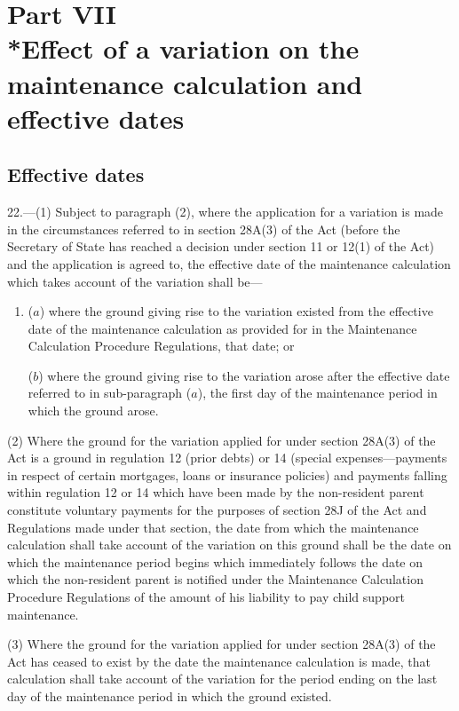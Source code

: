\documentclass[12pt,a4paper]{article}
\begin{document}
\section[Part VII --- Effect of a variation on the maintenance calculation and effective dates]{Part VII\\*Effect of a variation on the maintenance calculation and effective dates}

\renewcommand\parthead{--- Part VII}

\subsection[22. Effective dates]{Effective dates}

22.---(1)  Subject to paragraph (2), where the application for a variation is made in the circumstances referred to in section 28A(3) of the Act (before the Secretary of State has reached a decision under section 11 or 12(1) of the Act) and the application is agreed to, the effective date of the maintenance calculation which takes account of the variation shall be—
\begin{enumerate}\item[]
($a$) where the ground giving rise to the variation existed from the effective date of the maintenance calculation as provided for in the Maintenance Calculation Procedure Regulations, that date; or

($b$) where the ground giving rise to the variation arose after the effective date referred to in sub-paragraph ($a$), the first day of the maintenance period in which the ground arose.
\end{enumerate}

(2) Where the ground for the variation applied for under section 28A(3) of the Act is a ground in regulation 12 (prior debts) or 14 (special expenses—payments in respect of certain mortgages, loans or insurance policies) and payments falling within regulation 12 or 14 which have been made by the non-resident parent constitute voluntary payments for the purposes of section 28J of the Act and Regulations made under that section, the date from which the maintenance calculation shall take account of the variation on this ground shall be the date on which the maintenance period begins which immediately follows the date on which the non-resident parent is notified under the Maintenance Calculation Procedure Regulations of the amount of his liability to pay child support maintenance.

(3) Where the ground for the variation applied for under section 28A(3) of the Act has ceased to exist by the date the maintenance calculation is made, that calculation shall take account of the variation for the period ending on the last day of the maintenance period in which the ground existed.
\end{document}
